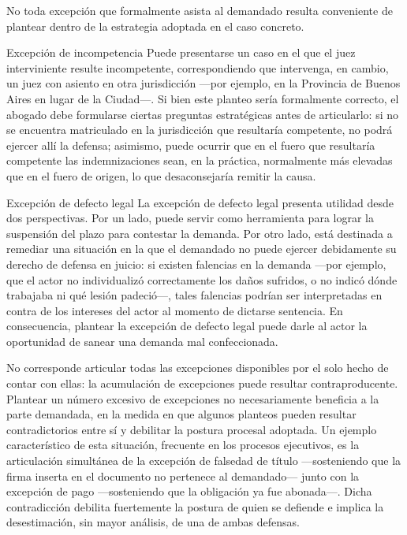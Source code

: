 \documentclass[12pt,oneside]{book}
\begin{document}
No toda excepción que formalmente asista al demandado resulta conveniente de plantear dentro de la estrategia adoptada en el caso concreto.

\begin{example}{Excepción de incompetencia}
Puede presentarse un caso en el que el juez interviniente resulte incompetente, correspondiendo que intervenga, en cambio, un juez con asiento en otra jurisdicción —por ejemplo, en la Provincia de Buenos Aires en lugar de la Ciudad—. Si bien este planteo sería formalmente correcto, el abogado debe formularse ciertas preguntas estratégicas antes de articularlo: si no se encuentra matriculado en la jurisdicción que resultaría competente, no podrá ejercer allí la defensa; asimismo, puede ocurrir que en el fuero que resultaría competente las indemnizaciones sean, en la práctica, normalmente más elevadas que en el fuero de origen, lo que desaconsejaría remitir la causa.
\end{example}

\begin{example}{Excepción de defecto legal}
La excepción de defecto legal presenta utilidad desde dos perspectivas. Por un lado, puede servir como herramienta para lograr la suspensión del plazo para contestar la demanda. Por otro lado, está destinada a remediar una situación en la que el demandado no puede ejercer debidamente su derecho de defensa en juicio: si existen falencias en la demanda —por ejemplo, que el actor no individualizó correctamente los daños sufridos, o no indicó dónde trabajaba ni qué lesión padeció—, tales falencias podrían ser interpretadas en contra de los intereses del actor al momento de dictarse sentencia. En consecuencia, plantear la excepción de defecto legal puede darle al actor la oportunidad de sanear una demanda mal confeccionada.
\end{example}

\begin{important}
No corresponde articular todas las excepciones disponibles por el solo hecho de contar con ellas: la acumulación de excepciones puede resultar contraproducente. Plantear un número excesivo de excepciones no necesariamente beneficia a la parte demandada, en la medida en que algunos planteos pueden resultar contradictorios entre sí y debilitar la postura procesal adoptada. Un ejemplo característico de esta situación, frecuente en los procesos ejecutivos, es la articulación simultánea de la excepción de falsedad de título —sosteniendo que la firma inserta en el documento no pertenece al demandado— junto con la excepción de pago —sosteniendo que la obligación ya fue abonada—. Dicha contradicción debilita fuertemente la postura de quien se defiende e implica la desestimación, sin mayor análisis, de una de ambas defensas.
\end{important}
\end{document}
